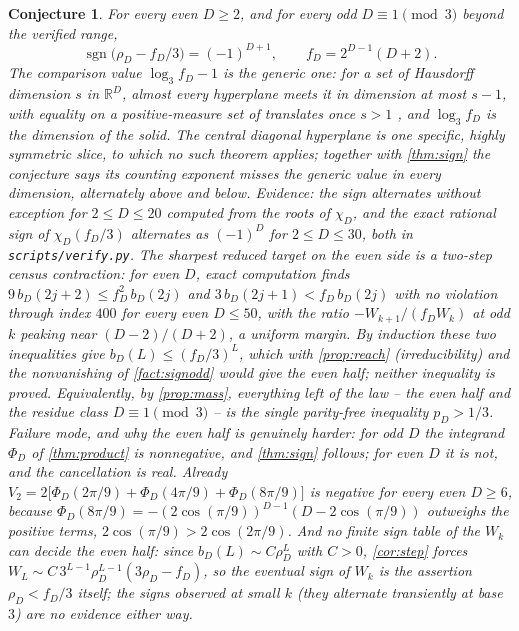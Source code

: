 \documentclass[11pt]{amsart}
\newtheorem{conjecture}[theorem]{Conjecture}
\theoremstyle{definition}
\theoremstyle{remark}
\begin{document}
\begin{conjecture}
\label{con:sign}
For every even $D \ge 2$, and for every odd $D \equiv 1 \pmod 3$ beyond the verified range,
\[
\operatorname{sgn}\bigl( \rho_D - f_D/3 \bigr) = (-1)^{D+1}, \qquad f_D = 2^{D-1}(D+2).
\]
The comparison value $\log_3 f_D - 1$ is the generic one: for a set of Hausdorff dimension $s$ in $\mathbb{R}^D$, almost every hyperplane meets it in dimension at most $s-1$, with equality on a positive-measure set of translates once $s > 1$ \cite{marstrand,mattila}, and $\log_3 f_D$ is the dimension of the solid. The central diagonal hyperplane is one specific, highly symmetric slice, to which no such theorem applies; together with \cref{thm:sign} the conjecture says its counting exponent misses the generic value in every dimension, alternately above and below.
Evidence: the sign alternates without exception for $2 \le D \le 20$ computed from the roots of $\chi_D$, and the exact rational sign of $\chi_D(f_D/3)$ alternates as $(-1)^D$ for $2 \le D \le 30$, both in \texttt{scripts/verify.py}.
The sharpest reduced target on the even side is a two-step census contraction: for even $D$, exact computation finds $9\, b_D(2j+2) \le f_D^2\, b_D(2j)$ and $3\, b_D(2j+1) < f_D\, b_D(2j)$ with no violation through index $400$ for every even $D \le 50$, with the ratio $-W_{k+1}/(f_D W_k)$ at odd $k$ peaking near $(D-2)/(D+2)$, a uniform margin. By induction these two inequalities give $b_D(L) \le (f_D/3)^L$, which with \cref{prop:reach} (irreducibility) and the nonvanishing of \cref{fact:signodd} would give the even half; neither inequality is proved. Equivalently, by \cref{prop:mass}, everything left of the law -- the even half and the residue class $D \equiv 1 \pmod 3$ -- is the single parity-free inequality $p_D > 1/3$.
Failure mode, and why the even half is genuinely harder: for odd $D$ the integrand $\Phi_D$ of \cref{thm:product} is nonnegative, and \cref{thm:sign} follows; for even $D$ it is not, and the cancellation is real. Already $V_2 = 2\bigl[\Phi_D(2\pi/9) + \Phi_D(4\pi/9) + \Phi_D(8\pi/9)\bigr]$ is negative for every even $D \ge 6$, because $\Phi_D(8\pi/9) = -(2\cos(\pi/9))^{D-1}(D - 2\cos(\pi/9))$ outweighs the positive terms, $2\cos(\pi/9) > 2\cos(2\pi/9)$. And no finite sign table of the $W_k$ can decide the even half: since $b_D(L) \sim C \rho_D^L$ with $C > 0$, \cref{cor:step} forces $W_L \sim C\, 3^{L-1} \rho_D^{L-1} (3\rho_D - f_D)$, so the eventual sign of $W_k$ \emph{is} the assertion $\rho_D < f_D/3$ itself; the signs observed at small $k$ (they alternate transiently at base $3$) are no evidence either way.
\end{conjecture}
\end{document}
